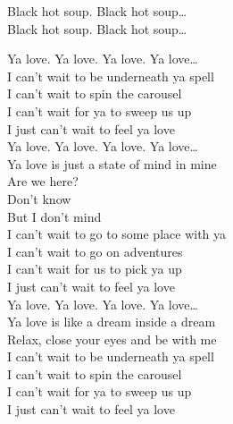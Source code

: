Black hot soup. Black hot soup… \\
Black hot soup. Black hot soup… \\




Ya love. Ya love. Ya love. Ya love… \\

I can't wait to be underneath ya spell \\
I can't wait to spin the carousel \\
I can't wait for ya to sweep us up \\
I just can't wait to feel ya love \\

Ya love. Ya love. Ya love. Ya love… \\

Ya love is just a state of mind in mine \\
Are we here? \\
Don't know \\
But I don't mind \\

I can't wait to go to some place with ya \\
I can't wait to go on adventures \\
I can't wait for us to pick ya up \\
I just can't wait to feel ya love \\

Ya love. Ya love. Ya love. Ya love… \\

Ya love is like a dream inside a dream \\
Relax, close your eyes and be with me \\

I can't wait to be underneath ya spell \\
I can't wait to spin the carousel \\
I can't wait for ya to sweep us up \\
I just can't wait to feel ya love \\




